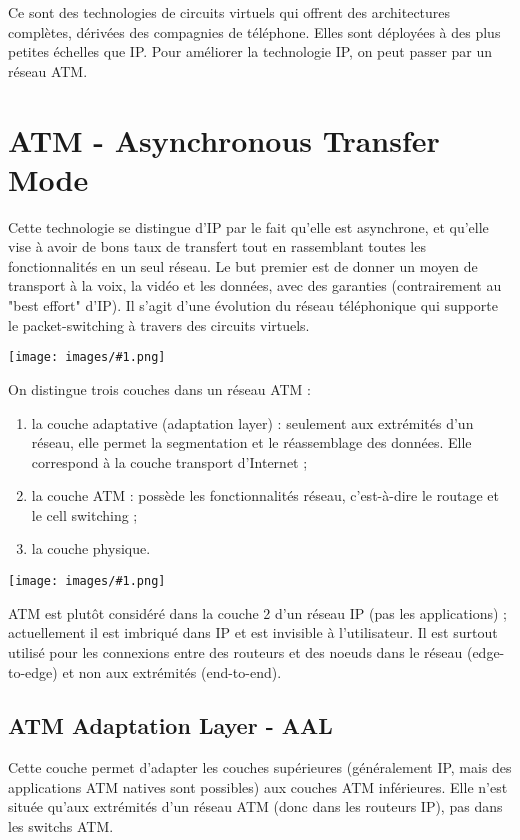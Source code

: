 \documentclass[10pt,a4paper]{report}
\newcommand{\dessin}[1]{\begin{center}\texttt{[image: images/\#1.png]}\end{center}}
\begin{document}
	Ce sont des technologies de circuits virtuels qui offrent des architectures complètes, dérivées des compagnies de téléphone. Elles sont déployées à des plus petites échelles que IP. Pour améliorer la technologie IP, on peut passer par un réseau ATM.
	
	\section{ATM - Asynchronous Transfer Mode}

	Cette technologie se distingue d'IP par le fait qu'elle est asynchrone, et qu'elle vise à avoir de bons taux de transfert tout en rassemblant toutes les fonctionnalités en un seul réseau.
	Le but premier est de donner un moyen de transport à la voix, la vidéo et les données, avec des garanties (contrairement au "best effort" d'IP). Il s'agit d'une évolution du réseau téléphonique qui supporte le packet-switching à travers des circuits virtuels.
	
	\dessin{6}
	
	On distingue trois couches dans un réseau ATM : 
	
	\begin{enumerate}
		\item la couche adaptative (adaptation layer) : seulement aux extrémités d'un réseau, elle permet la segmentation et le réassemblage des données. Elle correspond à la couche transport d'Internet ;
		\item la couche ATM : possède les fonctionnalités réseau, c'est-à-dire le routage et le cell switching ;
		\item la couche physique.
	\end{enumerate}
	
	\dessin{7}
	
	ATM est plutôt considéré dans la couche 2 d'un réseau IP (pas les applications) ; actuellement il est imbriqué dans IP et est invisible à l'utilisateur. Il est surtout utilisé pour les connexions entre des routeurs et des noeuds dans le réseau (edge-to-edge) et non aux extrémités (end-to-end).
	
		\subsection{ATM Adaptation Layer - AAL}
		
		Cette couche permet d'adapter les couches supérieures (généralement IP, mais des applications ATM natives sont possibles) aux couches ATM inférieures. Elle n'est située qu'aux extrémités d'un réseau ATM (donc dans les routeurs IP), pas dans les switchs ATM.
	
\end{document}
